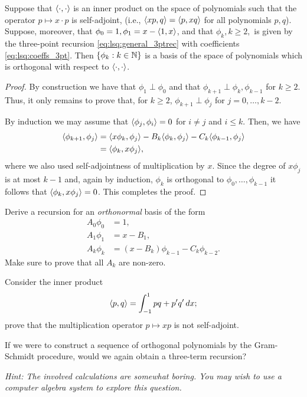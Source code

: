 \begin{proposition}
    Suppose that $\langle \cdot, \cdot\rangle$ is an inner product on  the space of
    polynomials such that the operator $p \mapsto x \cdot p$ is self-adjoint,
    (i.e., $\langle x p, q\rangle = \langle p, xq\rangle$ for all polynomials $p, q$). Suppose,
    moreover, that $\phi_0 = 1, \phi_1 = x - \langle1, x\rangle$, and that $\phi_k, k \geq 2,$
    is given by the three-point recursion \eqref{eq:lsq:general_3ptrec} with
    coefficients \eqref{eq:lsq:coeffs_3pt}. Then $\{ \phi_k : k \in \mathbb{N} \}$ is
    a basis of the space of polynomials which is orthogonal with respect to
    $\langle \cdot, \cdot \rangle$.
\end{proposition}
\begin{proof}
    By construction we have that $\phi_1 \perp \phi_0$ and that $\phi_{k+1}
    \perp \phi_k, \phi_{k-1}$ for $k \geq 2$. Thus, it only remains to prove
    that, for $k \geq 2$, $\phi_{k+1} \perp \phi_j$ for $j = 0, \dots, k-2$.

    By induction we may assume that $\langle \phi_j, \phi_i \rangle = 0$ for $i \neq j$
    and $i \leq k$. Then, we have
    \begin{align*}
        \langle \phi_{k+1}, \phi_j\rangle
        &=
        \langle x \phi_k, \phi_j \rangle - B_k \langle \phi_k, \phi_j\rangle - C_k \langle \phi_{k-1}, \phi_j\rangle \\
        &=  \langle \phi_k, x \phi_j \rangle,
    \end{align*}
    where we also used self-adjointness of multiplication by $x$. Since
    the degree of $x \phi_j$ is at most $k-1$ and, again by induction, $\phi_k$
    is orthogonal to $\phi_0, \dots, \phi_{k-1}$ it follows that
    $\langle \phi_k, x \phi_j \rangle = 0$. This completes the proof.
\end{proof}


\begin{exercise}
    Derive a recursion for an {\em orthonormal} basis of the form
    \begin{align*}
        A_0 \phi_0 &= 1, \\
        A_1 \phi_1 &= x - B_1, \\
        A_k \phi_k &= (x - B_k) \phi_{k-1} - C_k \phi_{k-2}.
    \end{align*}
    Make sure to prove that all $A_k$ are non-zero.
\end{exercise}

\begin{exercise}
    Consider the inner product
    \[
        \langle p, q\rangle =  \int_{-1}^1 pq + p'q' \, dx;
    \]
    prove that the multiplication operator $p \mapsto xp$ is not self-adjoint.

    If we were to construct a sequence of orthogonal polynomials by  the
    Gram-Schmidt procedure, would we again obtain a three-term recursion?

    {\it Hint: The involved calculations are somewhat boring. You may wish to use
    a computer algebra system to explore this question.}
\end{exercise}

